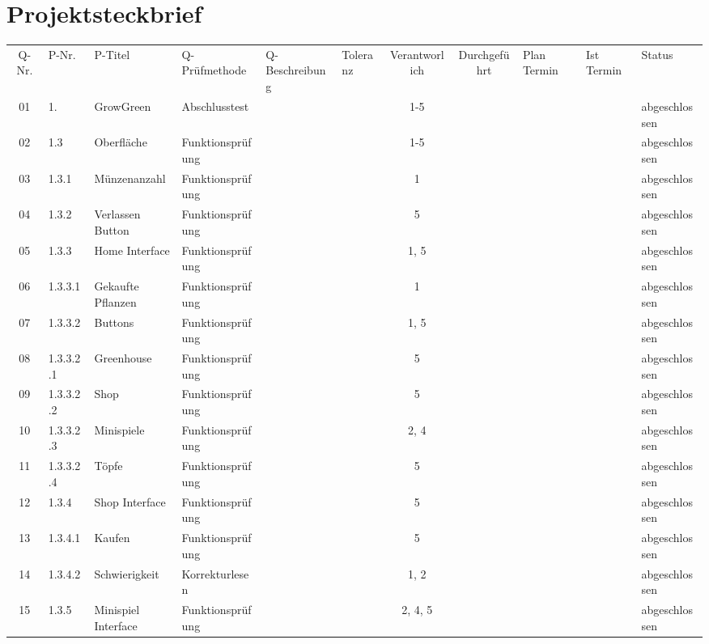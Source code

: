 \chapter{Projektsteckbrief}\label{ch:steckbrief}
\vspace{2cm}
\begin{table}[H]\label{tab:quality}
    \begin{tabular}{|c|l|l|l|l|l|c|c|l|l|l|}
        \hline
        Q-Nr. & P-Nr. & P-Titel & Q-Prüfmethode & Q-Beschreibung & Toleranz & Verantworlich & Durchgeführt & Plan Termin & Ist Termin & Status \\
        01 & 1. & GrowGreen & Abschlusstest &  &  & 1-5 &  &  &  & abgeschlossen \\
        02 & 1.3 & Oberfläche & Funktionsprüfung &  &  & 1-5 &  &  &  & abgeschlossen \\
        03 & 1.3.1 & Münzenanzahl & Funktionsprüfung &  &  & 1 &  &  &  & abgeschlossen \\
        04 & 1.3.2 & Verlassen Button & Funktionsprüfung &  &  & 5 &  &  &  & abgeschlossen \\
        05 & 1.3.3 & Home Interface & Funktionsprüfung &  &  & 1, 5 &  &  &  & abgeschlossen \\
        06 & 1.3.3.1 & Gekaufte Pflanzen & Funktionsprüfung &  &  & 1 &  &  &  & abgeschlossen \\
        07 & 1.3.3.2 & Buttons & Funktionsprüfung &  &  & 1, 5 &  &  &  & abgeschlossen \\
        08 & 1.3.3.2.1 & Greenhouse & Funktionsprüfung &  &  & 5 &  &  &  & abgeschlossen \\
        09 & 1.3.3.2.2 & Shop & Funktionsprüfung &  &  & 5 &  &  &  & abgeschlossen \\
        10 & 1.3.3.2.3 & Minispiele & Funktionsprüfung &  &  & 2, 4 &  &  &  & abgeschlossen \\
        11 & 1.3.3.2.4 & Töpfe & Funktionsprüfung &  &  & 5 &  &  &  & abgeschlossen \\
        12 & 1.3.4 & Shop Interface & Funktionsprüfung &  &  & 5 &  &  &  & abgeschlossen \\
        13 & 1.3.4.1 & Kaufen & Funktionsprüfung &  &  & 5 &  &  &  & abgeschlossen \\
        14 & 1.3.4.2 & Schwierigkeit & Korrekturlesen &  &  & 1, 2 &  &  &  & abgeschlossen \\
        15 & 1.3.5 & Minispiel Interface & Funktionsprüfung &  &  & 2, 4, 5 &  &  &  & abgeschlossen \\

\end{tabular}
\end{table}
